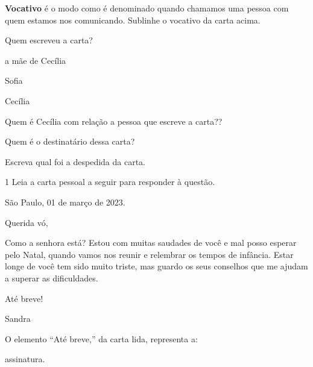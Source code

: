 \begin{escolha}
\item \textbf{Vocativo} é o modo como é denominado quando chamamos uma
pessoa com quem estamos nos comunicando. Sublinhe o vocativo da carta
acima.

\item Quem escreveu a carta?

\begin{boxlist}
\boxitem[\rosa{X}] a mãe de Cecília 

\boxitem[] Sofia

\boxitem[] Cecília
\end{boxlist}

\item Quem é Cecília com relação a pessoa que escreve a carta??


\item Quem é o destinatário dessa carta?


\item Escreva qual foi a despedida da carta. 



\num{1} Leia a carta pessoal a seguir para responder à questão.


\begin{mdframed}[linewidth=10pt,linecolor=salmao!20,backgroundcolor=salmao!20,roundcorner=20pt]
São Paulo, 01 de março de 2023.

Querida vó,

Como a senhora está? Estou com muitas saudades de você e mal posso
esperar pelo Natal, quando vamos nos reunir e relembrar os tempos de
infância. Estar longe de você tem sido muito triste, mas guardo os seus
conselhos que me ajudam a superar as dificuldades.

\begin{flushright}
Até breve!

Sandra
\end{flushright}
\end{mdframed}

O elemento ``Até breve,'' da carta lida, representa a:

\begin{escolha}
\item assinatura.


\end{escolha}
\end{escolha}
